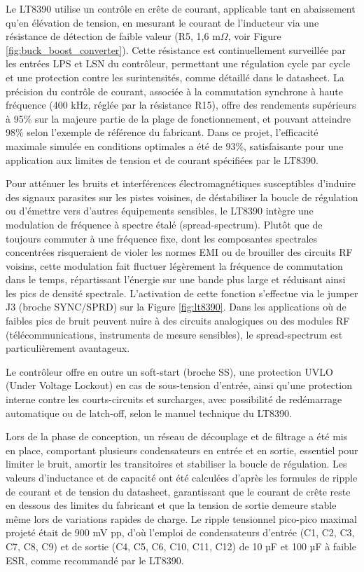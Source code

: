 Le LT8390 utilise un contrôle en crête de courant, applicable tant en abaissement qu'en élévation de tension, en mesurant le courant de l'inducteur via une résistance de détection de faible valeur (R5, 1,6 m$\Omega$, voir Figure \ref{fig:buck_boost_converter}). Cette résistance est continuellement surveillée par les entrées LPS et LSN du contrôleur, permettant une régulation cycle par cycle et une protection contre les surintensités, comme détaillé dans le datasheet. La précision du contrôle de courant, associée à la commutation synchrone à haute fréquence (400 kHz, réglée par la résistance R15), offre des rendements supérieurs à 95\% sur la majeure partie de la plage de fonctionnement, et pouvant atteindre 98\% selon l'exemple de référence du fabricant. Dans ce projet, l'efficacité maximale simulée en conditions optimales a été de 93\%, satisfaisante pour une application aux limites de tension et de courant spécifiées par le LT8390.

Pour atténuer les bruits et interférences électromagnétiques susceptibles d'induire des signaux parasites sur les pistes voisines, de déstabiliser la boucle de régulation ou d'émettre vers d'autres équipements sensibles, le LT8390 intègre une modulation de fréquence à spectre étalé (spread-spectrum). Plutôt que de toujours commuter à une fréquence fixe, dont les composantes spectrales concentrées risqueraient de violer les normes EMI ou de brouiller des circuits RF voisins, cette modulation fait fluctuer légèrement la fréquence de commutation dans le temps, répartissant l'énergie sur une bande plus large et réduisant ainsi les pics de densité spectrale. L'activation de cette fonction s'effectue via le jumper J3 (broche SYNC/SPRD) sur la Figure \ref{fig:lt8390}. Dans les applications où de faibles pics de bruit peuvent nuire à des circuits analogiques ou des modules RF (télécommunications, instruments de mesure sensibles), le spread-spectrum est particulièrement avantageux.

Le contrôleur offre en outre un soft-start (broche SS), une protection UVLO (Under Voltage Lockout) en cas de sous-tension d'entrée, ainsi qu'une protection interne contre les courts-circuits et surcharges, avec possibilité de redémarrage automatique ou de latch-off, selon le manuel technique du LT8390.

Lors de la phase de conception, un réseau de découplage et de filtrage a été mis en place, comportant plusieurs condensateurs en entrée et en sortie, essentiel pour limiter le bruit, amortir les transitoires et stabiliser la boucle de régulation. Les valeurs d'inductance et de capacité ont été calculées d'après les formules de ripple de courant et de tension du datasheet, garantissant que le courant de crête reste en dessous des limites du fabricant et que la tension de sortie demeure stable même lors de variations rapides de charge. Le ripple tensionnel pico-pico maximal projeté était de 900 mV pp, d'où l'emploi de condensateurs d'entrée (C1, C2, C3, C7, C8, C9) et de sortie (C4, C5, C6, C10, C11, C12) de 10 µF et 100 µF à faible ESR, comme recommandé par le LT8390.


